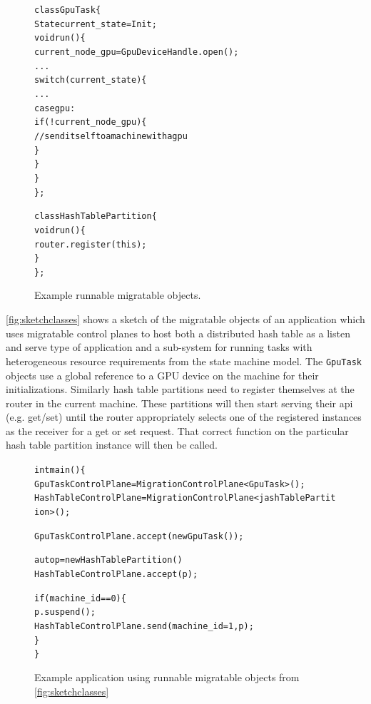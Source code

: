\begin{figure}[tp]
\begin{alltt}

class GpuTask \{
    State current_state = Init;
    void run() \{
        current_node_gpu = GpuDeviceHandle.open();
        ...
        switch(current_state) \{
            ...
            case gpu:
              if(!current_node_gpu) \{
                // send itself to a machine with a gpu
              \}
        \}
    \}
\};

class HashTablePartition \{
    void run() \{
        router.register(this);
    \}
\};
\end{alltt}
\caption{
    Example runnable migratable objects.
}
\label{fig:sketchclasses}
\end{figure}

\autoref{fig:sketchclasses} shows a sketch of the migratable objects of
an application which uses migratable control planes to
host both a distributed hash table as a listen and serve type of
application and a sub-system for running tasks with heterogeneous resource
requirements from the state machine model. The \texttt{GpuTask} objects
use a global reference to a GPU device on the machine for their
initializations. Similarly hash table partitions need to register
themselves at the router in the current machine. These partitions will
then start serving their api (e.g. get/set) until the router appropriately
selects one of the registered instances as the receiver for a get or set
request. That correct function on the particular hash table partition
instance will then be called.



\begin{figure}[tp]
\begin{alltt}
int main() \{
    GpuTaskControlPlane = MigrationControlPlane<GpuTask>();
    HashTableControlPlane = MigrationControlPlane<jashTablePartition>();

    GpuTaskControlPlane.accept(new GpuTask());

    auto p = new HashTablePartition()
    HashTableControlPlane.accept(p);

    if(machine_id == 0) \{
        p.suspend();
        HashTableControlPlane.send(machine_id=1, p);
    \}
\}


\end{alltt}
\caption{
    Example application using runnable migratable objects from \autoref{fig:sketchclasses}
}
\label{fig:sketchmain}
\end{figure}



